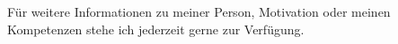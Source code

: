\begin{letter}{}
	Für weitere Informationen zu meiner Person, Motivation oder meinen Kompetenzen stehe ich jederzeit gerne zur Verfügung.


\end{letter}
